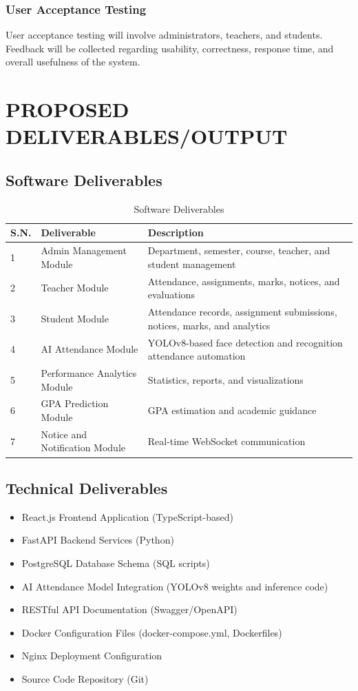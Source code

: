 \documentclass[12pt,a4paper,oneside]{report}
\let\oldsection\section
\renewcommand{\section}{\clearpage\oldsection}
\begin{document}
\subsection{User Acceptance Testing}
User acceptance testing will involve administrators, teachers, and students. Feedback will be collected regarding usability, correctness, response time, and overall usefulness of the system.

\chapter{PROPOSED DELIVERABLES/OUTPUT}
\section{Software Deliverables}
\begin{longtable}{|p{}|p{}|p{}|}
\caption{Software Deliverables}\\
\hline
\textbf{S.N.} & \textbf{Deliverable} & \textbf{Description} \\ \hline
1 & Admin Management Module & Department, semester, course, teacher, and student management \\ \hline
2 & Teacher Module & Attendance, assignments, marks, notices, and evaluations \\ \hline
3 & Student Module & Attendance records, assignment submissions, notices, marks, and analytics \\ \hline
4 & AI Attendance Module & YOLOv8-based face detection and recognition attendance automation \\ \hline
5 & Performance Analytics Module & Statistics, reports, and visualizations \\ \hline
6 & GPA Prediction Module & GPA estimation and academic guidance \\ \hline
7 & Notice and Notification Module & Real-time WebSocket communication \\ \hline
\end{longtable}

\section{Technical Deliverables}
\begin{itemize}
\item React.js Frontend Application (TypeScript-based)
\item FastAPI Backend Services (Python)
\item PostgreSQL Database Schema (SQL scripts)
\item AI Attendance Model Integration (YOLOv8 weights and inference code)
\item RESTful API Documentation (Swagger/OpenAPI)
\item Docker Configuration Files (docker-compose.yml, Dockerfiles)
\item Nginx Deployment Configuration
\item Source Code Repository (Git)
\end{itemize}
\end{document}
